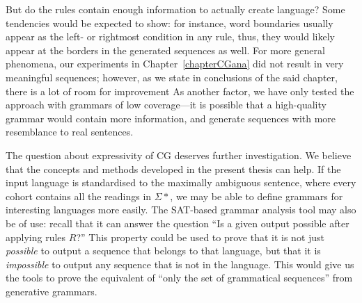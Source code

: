 But do the rules contain enough information to actually create language? 
Some tendencies would be expected to show: for instance, word boundaries usually appear 
as the left- or rightmost condition in any rule, thus, they would likely appear at the borders in the generated sequences as well.
For more general phenomena, our experiments in Chapter~\ref{chapterCGana} 
did not result in very meaningful sequences; 
however, as we state in conclusions of the said chapter, there is a lot of room for improvement 
As another factor, we have only tested the approach with grammars of low coverage---it is possible that a high-quality grammar would contain more information, and generate sequences with more resemblance to real sentences.

The question about expressivity of CG deserves further investigation. 
We believe that the concepts and methods developed in the present thesis can help. 
If the input language is standardised to the maximally ambiguous sentence, 
where every cohort contains all the readings in $\Sigma*$, 
we may be able to define grammars for interesting languages more easily. 
The SAT-based grammar analysis tool may also be of use: recall that it can answer 
the question ``Is a given output possible after applying rules $R$?''
This property could be used to prove that it is not just {\em possible} to output 
a sequence that belongs to that language, but that it is {\em impossible} to output 
any sequence that is not in the language.
This would give us the tools to prove the equivalent of ``only the set of grammatical sequences'' from generative grammars.










